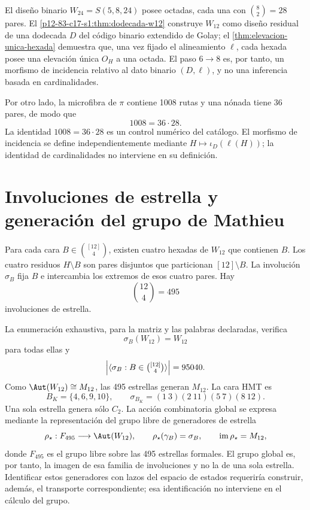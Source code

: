 El diseño binario \(W_{24}=S(5,8,24)\) posee octadas, cada una con
\(\binom82=28\) pares. El
\cref{p12-83-c17-s1:thm:dodecada-w12} construye
\(W_{12}\) como diseño residual de una dodecada \(D\) del código binario
extendido de Golay; el \cref{thm:elevacion-unica-hexada} demuestra que, una
vez fijado el alineamiento \(\ell\), cada hexada posee una elevación única
\(O_H\) a una octada. El paso \(6\to8\) es, por tanto, un morfismo de
incidencia relativo al dato binario \((D,\ell)\), y no una inferencia basada
en cardinalidades.

Por otro lado, la microfibra de \(\pi\) contiene 1008 rutas y una nónada tiene
36 pares, de modo que
\[
1008=36\cdot28.
\]
La identidad \(1008=36\cdot28\) es un control numérico del catálogo. El
morfismo de incidencia se define independientemente mediante
\(H\mapsto\iota_D(\ell(H))\); la identidad de cardinalidades no interviene en
su definición.

\section{Involuciones de estrella y generación del grupo de Mathieu}

Para cada cara \(B\in\binom{[12]}4\), existen cuatro hexadas de \(W_{12}\)
que contienen \(B\). Los cuatro residuos \(H\setminus B\) son pares disjuntos
que particionan \([12]\setminus B\). La involución \(\sigma_B\) fija \(B\)
e intercambia los extremos de esos cuatro pares. Hay
\[
\binom{12}{4}=495
\]
involuciones de estrella.

La enumeración exhaustiva, para la matriz y las palabras declaradas, verifica
\[
\sigma_B(W_{12})=W_{12}
\]
para todas ellas y
\[
\left|\langle\sigma_B:B\in\tbinom{[12]}4\rangle\right|=95040.
\]
Como \(\Aut(W_{12})\cong M_{12}\), las 495 estrellas generan \(M_{12}\).
La cara HMT es
\[
B_K=\{4,6,9,10\},
\qquad
\sigma_{B_K}=(1\ 3)(2\ 11)(5\ 7)(8\ 12).
\]
Una sola estrella genera sólo \(C_2\). La acción combinatoria global se
expresa mediante la representación del grupo libre de generadores de estrella
\[
\rho_\star:F_{495}\longrightarrow\Aut(W_{12}),
\qquad
\rho_\star(\gamma_B)=\sigma_B,
\qquad
\operatorname{im}\rho_\star=M_{12},
\]
donde \(F_{495}\) es el grupo libre sobre las 495 estrellas formales. El grupo
global es, por tanto, la imagen de esa familia de involuciones y no la de una
sola estrella. Identificar estos generadores con lazos del espacio de estados
requeriría construir, además, el transporte correspondiente; esa
identificación no interviene en el cálculo del grupo.

